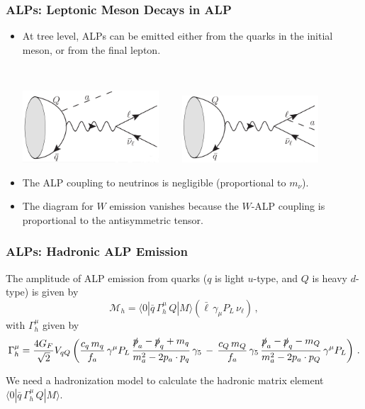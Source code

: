 \documentclass[mathserif, 10pt, dvipsnames]{beamer}
\begin{document}
\begin{frame}\frametitle{ALPs: Leptonic Meson Decays in ALP}
    \begin{itemize}
        \item At tree level, ALPs can be emitted either from the quarks in the initial meson, or from the final lepton.
              \vspace{0.5cm}

              ~

              {\centering
              \includegraphics[width=0.4\textwidth]{figures/Lept1.1}$\qquad$
              \includegraphics[width=0.4\textwidth]{figures/Lept1.3}}
              \vspace{0.5cm}
        \item The ALP coupling to neutrinos is negligible (proportional to $m_\nu$).
        \item The diagram for $W$ emission vanishes because the $W$-ALP coupling is proportional to the antisymmetric tensor.
    \end{itemize}
\end{frame}

\begin{frame}\frametitle{ALPs: Hadronic ALP Emission}
    The amplitude of ALP emission from quarks ($q$ is light $u$-type, and $Q$ is heavy $d$-type) is given by
    $$\mathcal{M}_h = \langle 0 |\bar{q}\,\Gamma^\mu_{h}\,Q|M\rangle \left(\bar{\ell} \,\gamma_\mu P_L \,\nu_\ell \right)\,,$$
    with $\Gamma^\mu_h$ given by
        {\small $$\Gamma^\mu_h = \frac{4 G_F}{\sqrt{2}} V_{qQ}
                \left(\frac{c_q\,m_q}{f_a}\,\gamma^\mu P_L\,\frac{\slashed{p}_a-\slashed{p}_q+m_q}{m_a^2 -2 p_a \cdot p_q}\,\gamma_5
                \,-\, \frac{c_Q\,m_Q}{f_a}\,\gamma_5\,\frac{\slashed{p}_a-\slashed{p}_q-m_Q}{m_a^2- 2 p_a \cdot p_Q}\,\gamma^\mu P_L \right)\,.$$}

    We need a hadronization model to calculate the hadronic matrix element $ \langle 0 |\bar{q}\,\Gamma^\mu_{h}\,Q|M\rangle$.

\end{frame}
\end{document}

